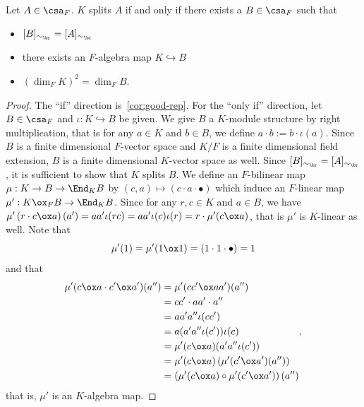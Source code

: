  \begin{theorem}\label{thm:good-rep-iff-split}
   Let $A\in\csa_{F}$. $K$ splits $A$ if and only if there exists a $B\in\csa_{F}$ such that
   \begin{itemize}
     \item $[B]_{\sim_{\br}}=[A]_{\sim_{\br}}$
     \item there exists an $F$-algebra map $K \hookrightarrow B$
     \item ${\left(\dim_{F}K\right)}^{2}=\dim_{F}B$.
   \end{itemize}
   \leanok
 \end{theorem}
 \begin{proof}
   The ``if'' direction is~\cref{cor:good-rep}. For the ``only if'' direction, let $B \in\csa_{F}$ and $\iota : K \hookrightarrow B$ be given. We give $B$ a $K$-module structure by right multiplication, that is for any $a \in K$ and $b \in B$, we define $a \cdot b := b \cdot \iota(a)$.
   Since $B$ is a finite dimensional $F$-vector space and $K/F$ is a finite dimensional field extension, $B$ is a finite dimensional $K$-vector space as well. Since $[B]_{\sim_{\br}}=[A]_{\sim_{\br}}$, it is sufficient to show that $K$ splits $B$.
   We define an $F$-bilinear map $\mu : K \to B \to \End_{K}B$ by $(c, a) \mapsto (c \cdot a \cdot \bullet)$ which induce an $F$-linear map $\mu' : K \ox_{F} B \to \End_{K}B$. Since for any $r, c\in K$ and $a \in B$, we have $\mu'\left(r \cdot c\ox a\right)(a') = a a' \iota(rc)=aa'\iota(c)\iota(r)=r\cdot \mu'(c\ox a)$, that is $\mu'$ is $K$-linear as well. Note that \[\mu'(1)=\mu'(1\ox 1) = (1\cdot 1\cdot \bullet) = 1\] and that
   \[
     \begin{aligned}
       \mu'(c\ox a \cdot c'\ox a')(a'') &= \mu'(cc'\ox aa')(a'') \\
                                        &= cc' \cdot aa' \cdot a'' \\
                                        &= aa' a'' \iota(c c') \\
                                        &= a(a' a'' \iota(c'))\iota(c) \\
                                        &=\mu'(c \ox a)(a' a'' \iota(c'))\\
                                        &=\mu'(c\ox a)\left(\mu'(c'\ox a')(a'')\right) \\
                                        &= \left(\mu'(c\ox a)\circ\mu'(c'\ox a')\right)(a'')
     \end{aligned},
     \]
     that is, $\mu'$ is an $K$-algebra map.


\end{proof}
